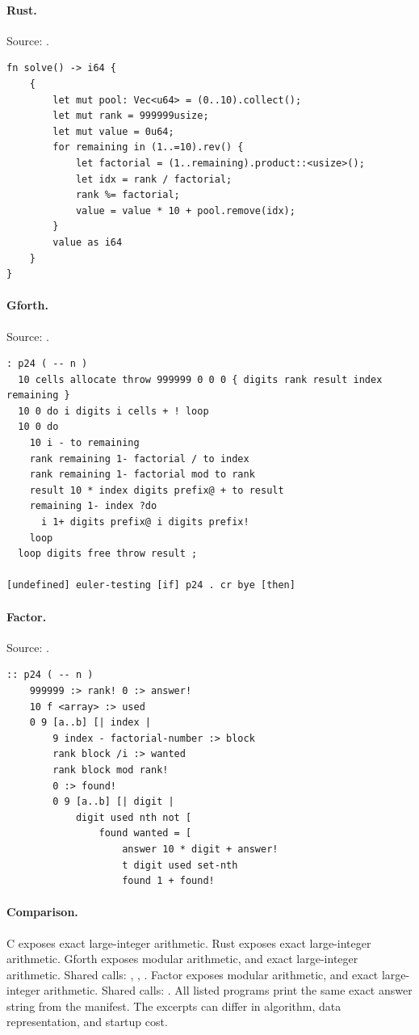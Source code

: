 \paragraph{Rust.} Source: .
\begin{lstlisting}
fn solve() -> i64 {
    {
        let mut pool: Vec<u64> = (0..10).collect();
        let mut rank = 999999usize;
        let mut value = 0u64;
        for remaining in (1..=10).rev() {
            let factorial = (1..remaining).product::<usize>();
            let idx = rank / factorial;
            rank %= factorial;
            value = value * 10 + pool.remove(idx);
        }
        value as i64
    }
}
\end{lstlisting}

\paragraph{Gforth.} Source: .
\begin{lstlisting}
: p24 ( -- n )
  10 cells allocate throw 999999 0 0 0 { digits rank result index remaining }
  10 0 do i digits i cells + ! loop
  10 0 do
    10 i - to remaining
    rank remaining 1- factorial / to index
    rank remaining 1- factorial mod to rank
    result 10 * index digits prefix@ + to result
    remaining 1- index ?do
      i 1+ digits prefix@ i digits prefix!
    loop
  loop digits free throw result ;

[undefined] euler-testing [if] p24 . cr bye [then]
\end{lstlisting}

\paragraph{Factor.} Source: .
\begin{lstlisting}
:: p24 ( -- n )
    999999 :> rank! 0 :> answer!
    10 f <array> :> used
    0 9 [a..b] [| index |
        9 index - factorial-number :> block
        rank block /i :> wanted
        rank block mod rank!
        0 :> found!
        0 9 [a..b] [| digit |
            digit used nth not [
                found wanted = [
                    answer 10 * digit + answer!
                    t digit used set-nth
                    found 1 + found!
\end{lstlisting}

\paragraph{Comparison.}
C exposes exact large-integer arithmetic. Rust exposes exact large-integer arithmetic. Gforth exposes modular arithmetic, and exact large-integer arithmetic. Shared calls: \texttt{}, \texttt{}, \texttt{}. Factor exposes modular arithmetic, and exact large-integer arithmetic. Shared calls: \texttt{}.
All listed programs print the same exact answer string from the manifest. The excerpts can differ in algorithm, data representation, and startup cost.

